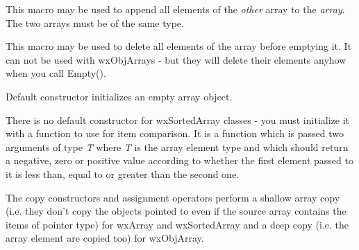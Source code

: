 \label{wxappendarray}


This macro may be used to append all elements of the {\it other} array to the
{\it array}. The two arrays must be of the same type.

\label{wxcleararray}


This macro may be used to delete all elements of the array before emptying it.
It can not be used with wxObjArrays - but they will delete their elements anyhow
when you call Empty().

\label{wxarrayctordef}



Default constructor initializes an empty array object.


There is no default constructor for wxSortedArray classes - you must initialize it
with a function to use for item comparison. It is a function which is passed
two arguments of type {\it T} where {\it T} is the array element type and which
should return a negative, zero or positive value according to whether the first
element passed to it is less than, equal to or greater than the second one.

\label{wxarrayctorcopy}







The copy constructors and assignment operators perform a shallow array copy
(i.e. they don't copy the objects pointed to even if the source array contains
the items of pointer type) for wxArray and wxSortedArray and a deep copy (i.e.
the array element are copied too) for wxObjArray.

